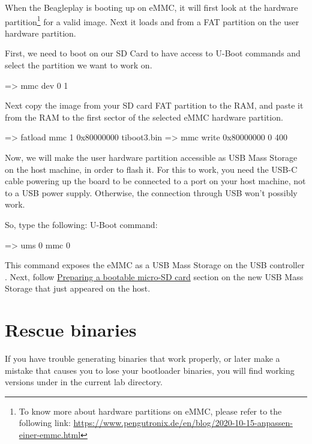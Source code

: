 When the Beagleplay is booting up on eMMC, it will first look at the
 hardware partition\footnote{To know more about hardware partitions
on eMMC, please refer to the following link:
\url{https://www.pengutronix.de/en/blog/2020-10-15-anpassen-einer-emmc.html}}
for a valid  image.
Next it loads  and  from a FAT partition on the
user hardware partition.

First, we need to boot on our SD Card to have access to U-Boot commands and
select the  partition we want to work on.

\begin{ubootinput}
  => mmc dev 0 1
\end{ubootinput}

Next copy the  image from your SD card FAT partition to the RAM,
and paste it from the RAM to the first sector of the selected eMMC hardware
partition.

\begin{ubootinput}
  => fatload mmc 1 0x80000000 tiboot3.bin
  => mmc write 0x80000000 0 400
\end{ubootinput}

Now, we will make the user hardware partition accessible as USB Mass Storage on
the host machine, in order to flash it. For this to work, you need the USB-C
cable powering up the board to be connected to a port on your host machine, not
to a USB power supply. Otherwise, the connection through USB won't possibly
work.

So, type the following:
 U-Boot command:
\begin{ubootinput}
  => ums 0 mmc 0
\end{ubootinput}
This command exposes the eMMC  as a USB Mass Storage on the USB
controller .
Next, follow \hyperref[sec:Prepboot]{Preparing a bootable micro-SD card} section
on the new USB Mass Storage that just appeared on the host.

\section{Rescue binaries}

If you have trouble generating binaries that work properly, or later
make a mistake that causes you to lose your bootloader binaries, you
will find working versions under  in the current lab
directory.
